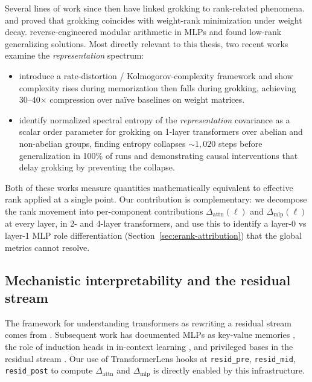\documentclass{article}
\begin{document}
Several lines of work since then have linked grokking to rank-related phenomena. \citet{liu2023grokkingrank} and \citet{lyu2023dichotomy} proved that grokking coincides with weight-rank minimization under weight decay. \citet{gromov2023grokking} reverse-engineered modular arithmetic in MLPs and found low-rank generalizing solutions. Most directly relevant to this thesis, two recent works examine the \emph{representation} spectrum:

\begin{itemize}
\item \citet{chen2025complexity} introduce a rate-distortion / Kolmogorov-complexity framework and show complexity rises during memorization then falls during grokking, achieving 30--40$\times$ compression over naïve baselines on weight matrices.
\item \citet{anonymous2026spectral} identify normalized spectral entropy of the \emph{representation} covariance as a scalar order parameter for grokking on 1-layer transformers over abelian and non-abelian groups, finding entropy collapses $\sim 1{,}020$ steps before generalization in 100\% of runs and demonstrating causal interventions that delay grokking by preventing the collapse.
\end{itemize}

Both of these works measure quantities mathematically equivalent to effective rank applied at a single point. Our contribution is complementary: we decompose the rank movement into per-component contributions $\Delta_{\text{attn}}(\ell)$ and $\Delta_{\text{mlp}}(\ell)$ at every layer, in 2- and 4-layer transformers, and use this to identify a layer-0 vs layer-1 MLP role differentiation (Section~\ref{sec:erank-attribution}) that the global metrics cannot resolve.

\subsection{Mechanistic interpretability and the residual stream}

The framework for understanding transformers as rewriting a residual stream comes from \citet{elhage2021framework}. Subsequent work has documented MLPs as key-value memories \citep{geva2021kv}, the role of induction heads in in-context learning \citep{olsson2022induction}, and privileged bases in the residual stream \citep{elhage2023privileged}. Our use of TransformerLens hooks \citep{nanda2022transformerlens} at \texttt{resid\_pre}, \texttt{resid\_mid}, \texttt{resid\_post} to compute $\Delta_{\text{attn}}$ and $\Delta_{\text{mlp}}$ is directly enabled by this infrastructure.
\end{document}
